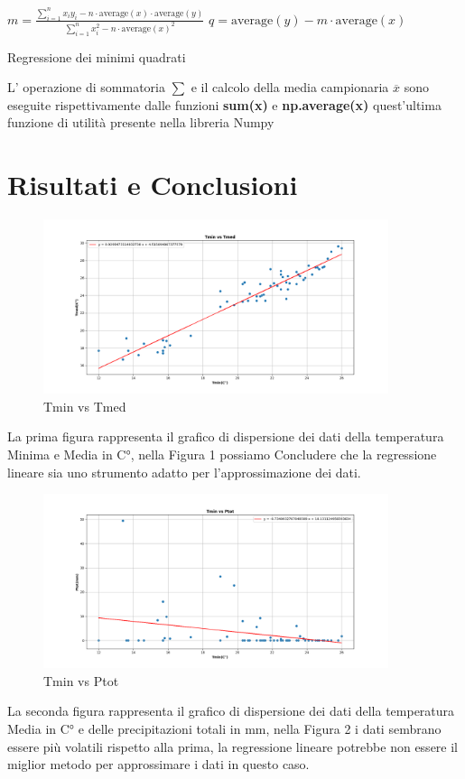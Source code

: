 \documentclass{article}
\begin{document}
\begin{algorithm}[H]
\SetAlgoLined
{}
\BlankLine
$m = \frac{{\sum_{i=1}^{n} x_i y_i - n \cdot \text{average}(x) \cdot \text{average}(y)}}{{\sum_{i=1}^{n} x_i^2 - n \cdot \text{average}(x)^2}}$\;
$q = \text{average}(y) - m \cdot \text{average}(x)$\;
\BlankLine
{}\;
\caption{Regressione dei minimi quadrati}
\end{algorithm}
L' operazione di sommatoria $\sum$ e il calcolo della media campionaria $\overline{x}$ sono eseguite rispettivamente dalle funzioni \textbf{sum(x)} e \textbf{np.average(x)} quest'ultima funzione di utilità presente nella libreria Numpy
\newpage
\section{Risultati e Conclusioni}

\begin{figure}[htbp]
    \centering
    \includegraphics[width=0.9\textwidth]{images/Tmin_vs_Tmed.png}
    \caption{Tmin vs Tmed}
    \label{Tmin vs Tmed}
\end{figure}

La prima figura rappresenta il grafico di dispersione dei dati della temperatura Minima e Media in C°, nella Figura 1 possiamo Concludere che la regressione lineare sia uno strumento adatto per l'approssimazione dei dati.

\begin{figure}[htbp]
    \centering
    \includegraphics[width=0.9\textwidth]{images/Tmin_vs_Ptot.png}
    \caption{Tmin vs Ptot}
    \label{Tmin vs Ptot}
\end{figure}
La seconda figura rappresenta il grafico di dispersione dei dati della temperatura Media in C° e delle precipitazioni totali in mm, nella Figura 2 i dati sembrano essere più volatili rispetto alla prima, la regressione lineare potrebbe non essere il miglior metodo per approssimare i dati in questo caso.
\end{document}
